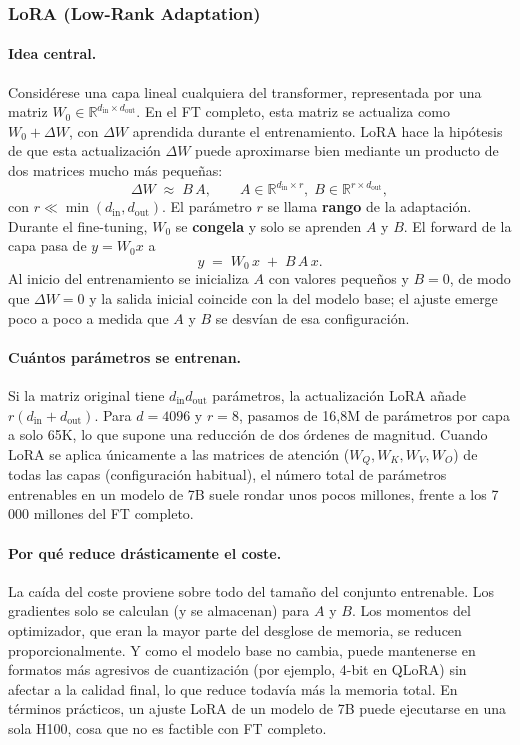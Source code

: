 \documentclass[11pt,a4paper]{article}
\begin{document}
\subsubsection{LoRA (Low-Rank Adaptation)}
\label{sec:finetuning-lora}

\paragraph{Idea central.} Considérese una capa lineal cualquiera del transformer, representada por una matriz $W_0 \in \mathbb{R}^{d_{\text{in}} \times d_{\text{out}}}$. En el FT completo, esta matriz se actualiza como $W_0 + \Delta W$, con $\Delta W$ aprendida durante el entrenamiento. LoRA hace la hipótesis de que esta actualización $\Delta W$ puede aproximarse bien mediante un producto de dos matrices mucho más pequeñas:
\[
\Delta W \;\approx\; B\,A,\qquad A\in\mathbb{R}^{d_{\text{in}}\times r},\; B\in\mathbb{R}^{r\times d_{\text{out}}},
\]
con $r \ll \min(d_{\text{in}}, d_{\text{out}})$. El parámetro $r$ se llama \textbf{rango} de la adaptación. Durante el fine-tuning, $W_0$ se \textbf{congela} y solo se aprenden $A$ y $B$. El forward de la capa pasa de $y = W_0 x$ a
\[
y \;=\; W_0\, x \;+\; B\,A\, x.
\]
Al inicio del entrenamiento se inicializa $A$ con valores pequeños y $B = 0$, de modo que $\Delta W = 0$ y la salida inicial coincide con la del modelo base; el ajuste emerge poco a poco a medida que $A$ y $B$ se desvían de esa configuración.

\paragraph{Cuántos parámetros se entrenan.} Si la matriz original tiene $d_{\text{in}} d_{\text{out}}$ parámetros, la actualización LoRA añade $r(d_{\text{in}} + d_{\text{out}})$. Para $d = 4096$ y $r = 8$, pasamos de 16{,}8M de parámetros por capa a solo 65K, lo que supone una reducción de dos órdenes de magnitud. Cuando LoRA se aplica únicamente a las matrices de atención ($W_Q, W_K, W_V, W_O$) de todas las capas (configuración habitual), el número total de parámetros entrenables en un modelo de 7B suele rondar unos pocos millones, frente a los 7\,000 millones del FT completo.

\paragraph{Por qué reduce drásticamente el coste.} La caída del coste proviene sobre todo del tamaño del conjunto entrenable. Los gradientes solo se calculan (y se almacenan) para $A$ y $B$. Los momentos del optimizador, que eran la mayor parte del desglose de memoria, se reducen proporcionalmente. Y como el modelo base no cambia, puede mantenerse en formatos más agresivos de cuantización (por ejemplo, 4-bit en QLoRA) sin afectar a la calidad final, lo que reduce todavía más la memoria total. En términos prácticos, un ajuste LoRA de un modelo de 7B puede ejecutarse en una sola H100, cosa que no es factible con FT completo.
\end{document}
